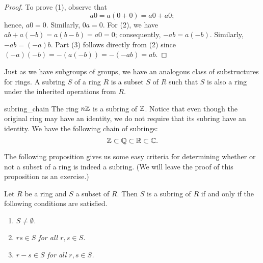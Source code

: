  
\begin{proof}
To prove (1), observe that
\[
a0 = a(0+0)= a0+ a0;
\]
hence, $a0=0$. Similarly, $0a = 0$. For (2), we have $ab + a(-b) =
a(b-b) = a0 = 0$; consequently, $-ab = a(-b)$. Similarly, $-ab =
(-a)b$. Part (3) follows directly from (2) since $(-a)(-b) = -(a(- b))
= -(-ab) = ab$. 
\end{proof}
 
 
\medskip
 
 
Just as we have subgroups of groups, we have an analogous class of 
\mbox{substructures} for rings. A {\bfi subring} $S$ 
of a ring
$R$ is a subset $S$ of $R$ such that $S$ is also a ring under the
inherited operations from $R$.
 
 
\begin{example}{subring_chain}
The ring $n {\Bbb Z}$ is a subring of ${\Bbb Z}$.  Notice that even
though the original ring may have an identity, we do not require
that its subring have an identity. We have the following chain of
subrings: 
\[
{\Bbb Z} \subset {\Bbb Q} \subset {\Bbb R} \subset {\Bbb C}.
\]
\end{example}
 
 

 
 
The following proposition gives us some easy criteria for determining
whether or not a  subset of a ring is indeed a subring. (We will leave
the proof of this proposition as an exercise.)
 
 
\begin{proposition}
Let $R$ be a ring and $S$ a subset of $R$.  Then $S$ is a subring of
$R$ if and only if the following conditions are satisfied. 
\begin{enumerate}
 
\rm \item \it
$S \neq \emptyset$.
 
\rm \item \it
$rs \in S$ for all $r, s \in S$.
 
\rm \item \it
$r-s \in S$ for all $r, s \in S$.
 
\end{enumerate}
\end{proposition}
 

